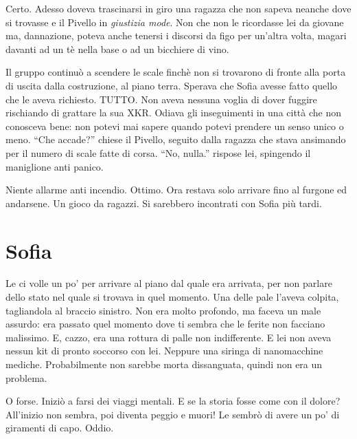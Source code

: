     Certo. Adesso doveva trascinarsi in giro una ragazza che non sapeva neanche dove si trovasse e il Pivello in
    \emph{giustizia mode}. Non che non le ricordasse lei da giovane ma, dannazione, poteva anche tenersi i discorsi da
    figo per un'altra volta, magari davanti ad un tè nella base o ad un bicchiere di vino.

    Il gruppo continuò a scendere le scale finchè non si trovarono di fronte alla porta di uscita dalla costruzione, al
    piano terra. Sperava che Sofia avesse fatto quello che le aveva richiesto. TUTTO. Non aveva nessuna voglia di dover
    fuggire rischiando di grattare la sua XKR. Odiava gli inseguimenti in una città che non conosceva bene: non potevi
    mai sapere quando potevi prendere un senso unico o meno. ``Che accade?'' chiese il Pivello, seguito dalla ragazza
    che stava ansimando per il numero di scale fatte di corsa. ``No, nulla.'' rispose lei, spingendo il maniglione anti
    panico.

    Niente allarme anti incendio. Ottimo. Ora restava solo arrivare fino al furgone ed andarsene. Un gioco da ragazzi.
    Si sarebbero incontrati con Sofia più tardi.

  \section*{Sofia}
    
    Le ci volle un po' per arrivare al piano dal quale era arrivata, per non parlare dello stato nel quale si trovava in
    quel momento. Una delle pale l'aveva colpita, tagliandola al braccio sinistro. Non era molto profondo, ma faceva un
    male assurdo: era passato quel momento dove ti sembra che le ferite non facciano malissimo. E, cazzo, era una
    rottura di palle non indifferente. E lei non aveva nessun kit di pronto soccorso con lei. Neppure una siringa di nanomacchine mediche.
    Probabilmente non sarebbe morta dissanguata, quindi non era un problema.

    O forse. Iniziò a farsi dei viaggi mentali. E se la storia fosse come con il dolore? All'inizio non sembra, poi
    diventa peggio e muori! Le sembrò di avere un po' di giramenti di capo. Oddio. 
